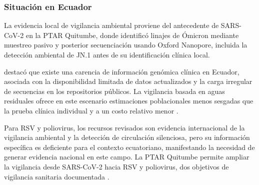 \subsubsection{Situación en Ecuador}

La evidencia local de vigilancia ambiental proviene del antecedente de SARS-CoV-2 en la PTAR Quitumbe, donde  identificó linajes de Ómicron mediante muestreo pasivo y posterior secuenciación usando Oxford Nanopore, incluida la detección ambiental de JN.1 antes de su identificación clínica local.

 destacó que existe una carencia de información genómica clínica en Ecuador, asociada con la disponibilidad limitada de datos actualizados y la carga irregular de secuencias en los repositorios públicos. La vigilancia basada en aguas residuales ofrece en este escenario estimaciones poblacionales menos sesgadas que la prueba clínica individual y a un costo relativo menor \cite{Karthikeyan_2022}.

Para RSV y poliovirus, los recursos revisados son evidencia internacional de la vigilancia ambiental y la detección de circulación silenciosa, pero su información específica es deficiente para el contexto ecuatoriano, manifestando la necesidad de generar evidencia nacional en este campo. La PTAR Quitumbe permite ampliar la vigilancia desde SARS-CoV-2 hacia RSV y poliovirus, dos objetivos de vigilancia sanitaria documentada \cite{Asghar_2014,Hughes_2022,Bottcher_2025}.

